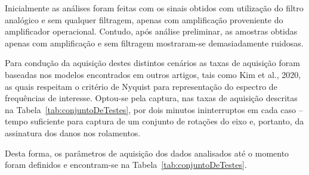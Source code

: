 \documentclass[
	12pt,				
	oneside,			
	a4paper,			
	english,			
	brazil,			
	]{abntex2ppgsi}
\begin{document}

Inicialmente as análises foram feitas com os sinais obtidos com utilização do filtro analógico e sem qualquer filtragem, apenas com amplificação proveniente do amplificador operacional. Contudo, após análise preliminar, as amostras obtidas apenas com amplificação e sem filtragem mostraram-se demasiadamente ruidosas. 

Para condução da aquisição destes distintos cenários as taxas de aquisição foram baseadas nos modelos encontrados em outros artigos, tais como Kim et al., 2020, as quais respeitam o critério de Nyquist para representação do espectro de frequências de interesse. Optou-se pela captura, nas taxas de aquisição descritas na Tabela~\ref{tab:conjuntoDeTestes}, por dois minutos ininterruptos em cada caso – tempo suficiente para captura de um conjunto de rotações do eixo e, portanto, da assinatura dos danos nos rolamentos. 

Desta forma, os parâmetros de aquisição dos dados analisados até o momento foram definidos e encontram-se na Tabela~\ref{tab:conjuntoDeTestes}.
\end{document}
